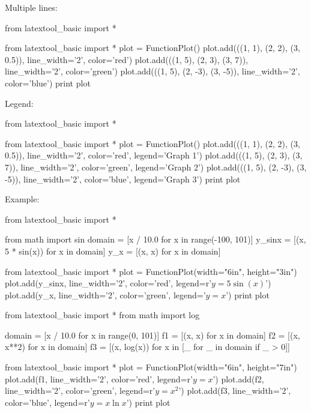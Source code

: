 \newpage

Multiple lines:

\begin{python}
from latextool_basic import *

from latextool_basic import *
plot = FunctionPlot()
plot.add(((1, 1), (2, 2), (3, 0.5)), line_width='2', color='red')
plot.add(((1, 5), (2, 3), (3, 7)), line_width='2', color='green')
plot.add(((1, 5), (2, -3), (3, -5)), line_width='2', color='blue')
print plot
\end{python}


\newpage

Legend:

\begin{python}
from latextool_basic import *

from latextool_basic import *
plot = FunctionPlot()
plot.add(((1, 1), (2, 2), (3, 0.5)), line_width='2', color='red', legend='Graph 1')
plot.add(((1, 5), (2, 3), (3, 7)), line_width='2', color='green', legend='Graph 2')
plot.add(((1, 5), (2, -3), (3, -5)), line_width='2', color='blue', legend='Graph 3')
print plot
\end{python}


\newpage

Example:

\begin{python}
from latextool_basic import *

from math import sin
domain = [x / 10.0 for x in range(-100, 101)]
y_sinx = [(x, 5 * sin(x)) for x in domain]
y_x = [(x, x) for x in domain]

from latextool_basic import *
plot = FunctionPlot(width="6in", height="3in")
plot.add(y_sinx, line_width='2', color='red', legend=r'$y = 5 \sin(x)$')
plot.add(y_x, line_width='2', color='green', legend='$y = x$')
print plot
\end{python}


\begin{python}
from latextool_basic import *
from math import log

domain = [x / 10.0 for x in range(0, 101)]
f1 = [(x, x) for x in domain]
f2 = [(x, x**2) for x in domain]
f3 = [(x, log(x)) for x in [_ for _ in domain if _ > 0]]

from latextool_basic import *
plot = FunctionPlot(width="6in", height="7in")
plot.add(f1, line_width='2', color='red', legend=r'$y = x$')
plot.add(f2, line_width='2', color='green', legend=r'$y = x^2$')
plot.add(f3, line_width='2', color='blue', legend=r'$y = x \ln x$')
print plot
\end{python}
